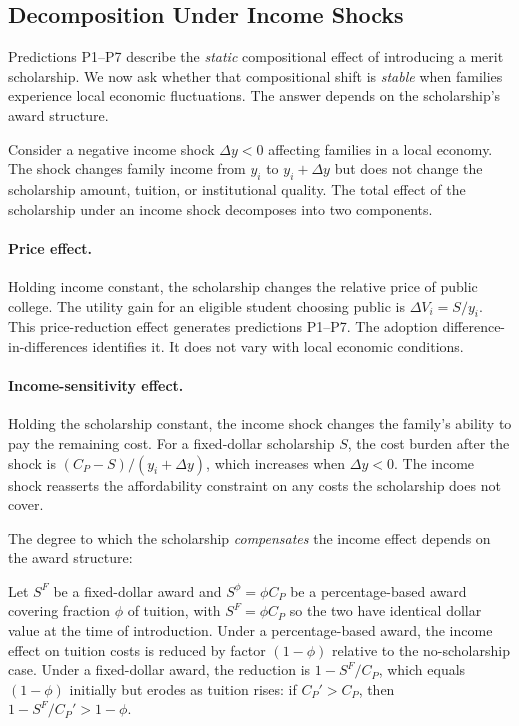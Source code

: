 \subsection{Decomposition Under Income Shocks}
\label{sec:theory_decomposition}

Predictions P1--P7 describe the \emph{static} compositional effect of
introducing a merit scholarship. We now ask whether that compositional
shift is \emph{stable} when families experience local economic
fluctuations. The answer depends on the scholarship's award structure.

Consider a negative income shock $\Delta y < 0$ affecting families in
a local economy. The shock changes family income from $y_i$ to
$y_i + \Delta y$ but does not change the scholarship amount, tuition,
or institutional quality. The total effect of the scholarship under an
income shock decomposes into two components.

\paragraph{Price effect.}
Holding income constant, the scholarship changes the relative price of
public college. The utility gain for an eligible student choosing
public is $\Delta V_i = S/y_i$. This price-reduction effect generates
predictions P1--P7. The adoption difference-in-differences identifies
it. It does not vary with local economic conditions.

\paragraph{Income-sensitivity effect.}
Holding the scholarship constant, the income shock changes the
family's ability to pay the remaining cost. For a fixed-dollar
scholarship $S$, the cost burden after the shock is
$(C_P - S)/(y_i + \Delta y)$, which increases when $\Delta y < 0$.
The income shock reasserts the affordability constraint on any costs
the scholarship does not cover.

The degree to which the scholarship \emph{compensates} the income
effect depends on the award structure:

\begin{proposition}
\label{prop:compensation}
Let $S^F$ be a fixed-dollar award and $S^\phi = \phi C_P$ be a
percentage-based award covering fraction $\phi$ of tuition, with
$S^F = \phi C_P$ so the two have identical dollar value at the time
of introduction. Under a percentage-based award, the income effect
on tuition costs is reduced by factor $(1 - \phi)$ relative to the
no-scholarship case. Under a fixed-dollar award, the reduction is
$1 - S^F/C_P$, which equals $(1 - \phi)$ initially but erodes as
tuition rises: if $C_P' > C_P$, then $1 - S^F/C_P' > 1 - \phi$.
\end{proposition}

